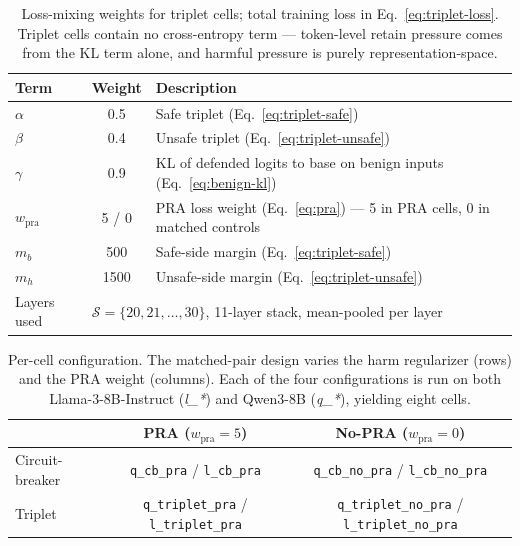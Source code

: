 \begin{table}[t]
  \centering
  \small
  \caption{Loss-mixing weights for triplet cells; total training
    loss in Eq.~\eqref{eq:triplet-loss}.  Triplet cells contain no
    cross-entropy term --- token-level retain pressure comes from
    the KL term alone, and harmful pressure is purely
    representation-space.}
  \label{tab:triplet-loss}
  \begin{tabular}{@{}l c l@{}}
    \toprule
    Term & Weight & Description \\
    \midrule
    \(\alpha\)             & 0.5   & Safe triplet (Eq.~\ref{eq:triplet-safe}) \\
    \(\beta\)              & 0.4   & Unsafe triplet (Eq.~\ref{eq:triplet-unsafe}) \\
    \(\gamma\)             & 0.9   & KL of defended logits to base on benign inputs (Eq.~\ref{eq:benign-kl}) \\
    \(w_\text{pra}\)       & 5 / 0 & PRA loss weight (Eq.~\ref{eq:pra}) --- 5 in PRA cells, 0 in matched controls \\
    \(m_b\)                & 500   & Safe-side margin (Eq.~\ref{eq:triplet-safe}) \\
    \(m_h\)                & 1500  & Unsafe-side margin (Eq.~\ref{eq:triplet-unsafe}) \\
    Layers used            & \multicolumn{2}{l}{\(\mathcal{S}=\{20,21,\dots,30\}\), 11-layer stack, mean-pooled per layer} \\
    \bottomrule
  \end{tabular}
\end{table}


\begin{table}[t]
  \centering
  \small
  \caption{Per-cell configuration.  The matched-pair design varies
    the harm regularizer (rows) and the PRA weight (columns).  Each
    of the four configurations is run on both Llama-3-8B-Instruct
    (\textit{l\_*}) and Qwen3-8B (\textit{q\_*}), yielding eight cells.}
  \label{tab:cell-config}
  \begin{tabular}{@{}l c c@{}}
    \toprule
                     & PRA (\(w_\text{pra}\!=\!5\)) & No-PRA (\(w_\text{pra}\!=\!0\)) \\
    \midrule
    Circuit-breaker  & \texttt{q\_cb\_pra}      / \texttt{l\_cb\_pra}      & \texttt{q\_cb\_no\_pra}      / \texttt{l\_cb\_no\_pra}      \\
    Triplet          & \texttt{q\_triplet\_pra} / \texttt{l\_triplet\_pra} & \texttt{q\_triplet\_no\_pra} / \texttt{l\_triplet\_no\_pra} \\
    \bottomrule
  \end{tabular}
\end{table}


